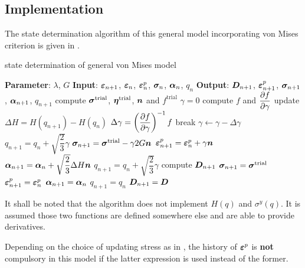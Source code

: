 \subsection{Implementation}
The state determination algorithm of this general model incorporating von Mises criterion is given in .
\begin{breakablealgorithm}
\caption{state determination of general von Mises model}\label{algo:j2_model}
\begin{algorithmic}
\State \textbf{Parameter}: $\lambda$, $G$
\State \textbf{Input}: $\bm{\varepsilon}_{n+1}$, $\bm{\varepsilon}_n$, $\bm{\varepsilon}^p_n$, $\bm{\sigma}_n$, $\bm{\alpha}_n$, $q_n$
\State \textbf{Output}: $\bm{D}_{n+1}$, $\bm{\varepsilon}^p_{n+1}$, $\bm{\sigma}_{n+1}$, $\bm{\alpha}_{n+1}$, $q_{n+1}$
\State compute $\bm{\sigma}^\text{trial}$, $\bm{\eta}^\text{trial}$, $\bm{n}$ and $f^\text{trial}$
\State $\gamma=0$
\State compute $f$ and $\dfrac{\partial{f}}{\partial{\gamma}}$
\State update $\Delta{}H=H\left(q_{n+1}\right)-H\left(q_n\right)$
\State $\Delta\gamma=\left(\dfrac{\partial{f}}{\partial{\gamma}}\right)^{-1}f$
\State break
\EndIf
\State $\gamma\leftarrow\gamma-\Delta\gamma$
\State $q_{n+1}=q_n+\sqrt{\dfrac{2}{3}}\gamma$
\EndWhile
\State $\bm{\sigma}_{n+1}=\bm{\sigma}^\text{trial}-\gamma2G\bm{n}$
\State $\bm{\varepsilon}^p_{n+1}=\bm{\varepsilon}^p_n+\gamma\bm{n}$
\State $\bm{\alpha}_{n+1}=\bm{\alpha}_n+\sqrt{\dfrac{2}{3}}\Delta{}H\bm{n}$
\State $q_{n+1}=q_n+\sqrt{\dfrac{2}{3}}\gamma$
\State compute $\bm{D}_{n+1}$
\Else
\State $\bm{\sigma}_{n+1}=\bm{\sigma}^\text{trial}$
\State $\bm{\varepsilon}^p_{n+1}=\bm{\varepsilon}^p_n$
\State $\bm{\alpha}_{n+1}=\bm{\alpha}_n$
\State $q_{n+1}=q_n$
\State $\bm{D}_{n+1}=\bm{D}$
\EndIf
\end{algorithmic}
\end{breakablealgorithm}
It shall be noted that the algorithm does not implement $H\left(q\right)$ and $\sigma^y\left(q\right)$. It is assumed those two functions are defined somewhere else and are able to provide derivatives.

Depending on the choice of updating stress as in , the history of $\bm{\varepsilon}^p$ is \textbf{not} compulsory in this model if the latter expression is used instead of the former.
